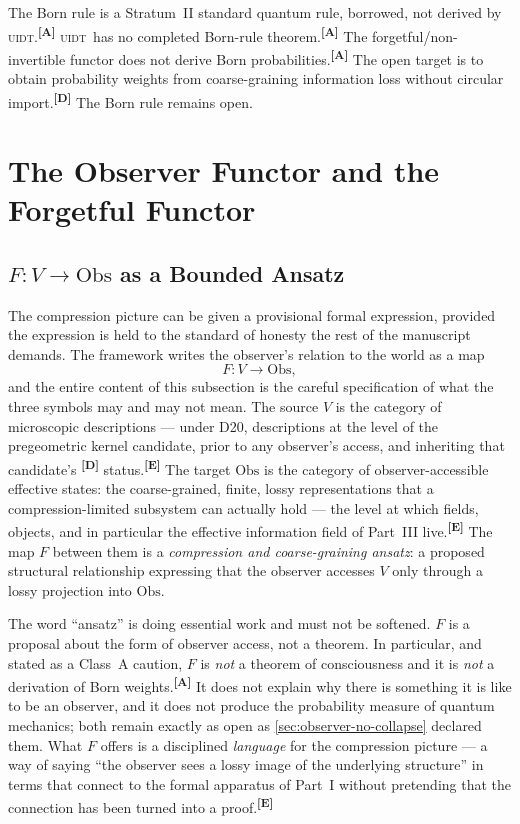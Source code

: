 \documentclass[12pt,a4paper,twoside]{article}
\theoremstyle{plain}
\theoremstyle{definition}
\theoremstyle{remark}
\newcommand{\UIDT}{\textsc{uidt}}
\newcommand{\catmark}[1]{\textsuperscript{\textsf{\textbf{[#1]}}}}
\begin{document}
\begin{governancebox}
The Born rule is a Stratum~II standard quantum rule, borrowed, not
derived by \UIDT.\catmark{A} \UIDT\ has no completed Born-rule
theorem.\catmark{A} The forgetful/non-invertible functor does not derive
Born probabilities.\catmark{A} The open target is to obtain probability
weights from coarse-graining information loss without circular
import.\catmark{D} The Born rule remains open.
\end{governancebox}

\section{The Observer Functor and the Forgetful Functor}
\label{sec:observer-functor}

\subsection{\texorpdfstring{$F\colon V \to \mathrm{Obs}$}{F: V to Obs} as a Bounded Ansatz}
\label{subsec:observer-functor-ansatz}

The compression picture can be given a provisional formal expression,
provided the expression is held to the standard of honesty the rest of
the manuscript demands. The framework writes the observer's relation to
the world as a map
\[
 F\colon V \longrightarrow \mathrm{Obs},
\]
and the entire content of this subsection is the careful specification
of what the three symbols may and may not mean. The source $V$ is the
category of microscopic descriptions --- under D20, descriptions at the
level of the pregeometric kernel candidate, prior to any observer's
access, and inheriting that candidate's \catmark{D} status.\catmark{E}
The target $\mathrm{Obs}$ is the category of observer-accessible
effective states: the coarse-grained, finite, lossy representations that
a compression-limited subsystem can actually hold --- the level at which
fields, objects, and in particular the effective information field of
Part~III live.\catmark{E} The map $F$ between them is a
\emph{compression and coarse-graining ansatz}: a proposed structural
relationship expressing that the observer accesses $V$ only through a
lossy projection into $\mathrm{Obs}$.

The word ``ansatz'' is doing essential work and must not be softened.
$F$ is a proposal about the form of observer access, not a theorem. In
particular, and stated as a Class~A caution, $F$ is \emph{not} a theorem
of consciousness and it is \emph{not} a derivation of Born
weights.\catmark{A} It does not explain why there is something it is
like to be an observer, and it does not produce the probability measure
of quantum mechanics; both remain exactly as open as
\cref{sec:observer-no-collapse} declared them. What $F$ offers is a
disciplined \emph{language} for the compression picture --- a way of
saying ``the observer sees a lossy image of the underlying structure''
in terms that connect to the formal apparatus of Part~I without
pretending that the connection has been turned into a proof.\catmark{E}
\end{document}
